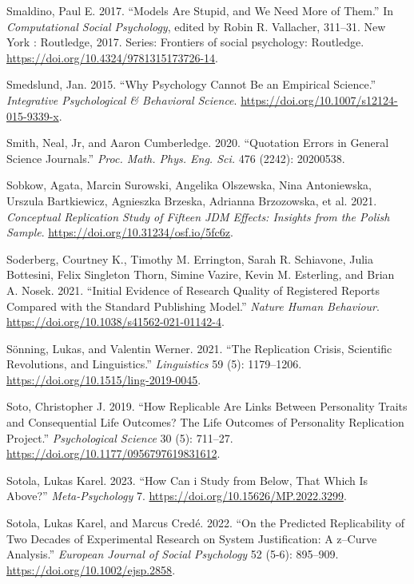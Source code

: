 \documentclass[
  letterpaper,
  DIV=11,
  numbers=noendperiod]{scrreprt}
\newlength{\cslhangindent}
\newenvironment{CSLReferences}[2] %
 {\begin{list}{}{%
  \setlength{\itemindent}{0pt}
  \setlength{\leftmargin}{0pt}
  \setlength{\parsep}{0pt}
  \ifodd #1
   \setlength{\leftmargin}{\cslhangindent}
   \setlength{\itemindent}{-1\cslhangindent}
  \fi
  \setlength{\itemsep}{#2\baselineskip}}}
 {\end{list}}
\begin{document}
\begin{CSLReferences}{1}{0}
Smaldino, Paul E. 2017. {``Models Are Stupid, and We Need More of
Them.''} In \emph{Computational Social Psychology}, edited by Robin R.
Vallacher, 311--31. New York : Routledge, 2017. \textbar{} Series:
Frontiers of social psychology: Routledge.
\url{https://doi.org/10.4324/9781315173726-14}.

Smedslund, Jan. 2015. {``Why Psychology Cannot Be an Empirical
Science.''} \emph{Integrative Psychological {\&} Behavioral Science}.
\url{https://doi.org/10.1007/s12124-015-9339-x}.

Smith, Neal, Jr, and Aaron Cumberledge. 2020. {``Quotation Errors in
General Science Journals.''} \emph{Proc. Math. Phys. Eng. Sci.} 476
(2242): 20200538.

Sobkow, Agata, Marcin Surowski, Angelika Olszewska, Nina Antoniewska,
Urszula Bartkiewicz, Agnieszka Brzeska, Adrianna Brzozowska, et al.
2021. \emph{Conceptual Replication Study of Fifteen JDM Effects:
Insights from the Polish Sample}.
\url{https://doi.org/10.31234/osf.io/5fc6z}.

Soderberg, Courtney K., Timothy M. Errington, Sarah R. Schiavone, Julia
Bottesini, Felix Singleton Thorn, Simine Vazire, Kevin M. Esterling, and
Brian A. Nosek. 2021. {``Initial Evidence of Research Quality of
Registered Reports Compared with the Standard Publishing Model.''}
\emph{Nature Human Behaviour}.
\url{https://doi.org/10.1038/s41562-021-01142-4}.

Sönning, Lukas, and Valentin Werner. 2021. {``The Replication Crisis,
Scientific Revolutions, and Linguistics.''} \emph{Linguistics} 59 (5):
1179--1206. \url{https://doi.org/10.1515/ling-2019-0045}.

Soto, Christopher J. 2019. {``How Replicable Are Links Between
Personality Traits and Consequential Life Outcomes? The Life Outcomes of
Personality Replication Project.''} \emph{Psychological Science} 30 (5):
711--27. \url{https://doi.org/10.1177/0956797619831612}.

Sotola, Lukas Karel. 2023. {``How Can i Study from Below, That Which Is
Above?''} \emph{Meta-Psychology} 7.
\url{https://doi.org/10.15626/MP.2022.3299}.

Sotola, Lukas Karel, and Marcus Credé. 2022. {``On the Predicted
Replicability of Two Decades of Experimental Research on System
Justification: A z--Curve Analysis.''} \emph{European Journal of Social
Psychology} 52 (5-6): 895--909. \url{https://doi.org/10.1002/ejsp.2858}.


\end{CSLReferences}
\end{document}
